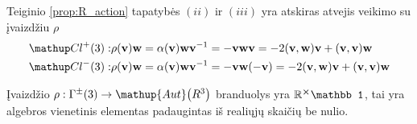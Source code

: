 \begin{example}
	Teiginio \ref{prop:R_action} tapatybės $(ii)$ ir $(iii)$ 
	yra atskiras atvejis veikimo su įvaizdžiu $\rho$
	\begin{align}
		\Clp:& \rho(\vb v)\vb w 
		= \alpha(\vb v) \vb w {\vb v}^{-1}
		= -\vb v \vb w \vb v
		= -2(\vb v,\vb w) \vb v + (\vb v,\vb v)\vb w
		\\
		\Clm:& \rho(\vb v)\vb w 
		= \alpha(\vb v) \vb w {\vb v}^{-1}
		= -\vb v \vb w (-\vb v)
		= -2(\vb v,\vb w) \vb v + (\vb v,\vb v)\vb w
	\end{align}
\end{example}

\begin{proposition}
	\label{prop:rho_kern}
	Įvaizdžio $\rho: \Gamma^\pm(3) \to \mathup{Aut}\qty(R^3)$ branduolys yra
	$\set R^{\cross} \mathbb1 $,
	tai yra algebros vienetinis elementas padaugintas iš realiųjų skaičių be nulio.
\end{proposition}
